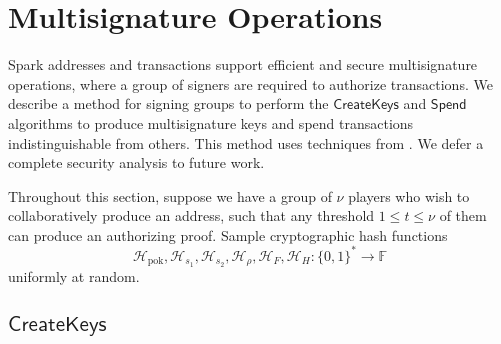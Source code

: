\documentclass{llncs}
\newcommand{\F}{\mathbb{F}}
\newcommand{\hash}{\mathcal{H}}
\newcommand{\func}[1]{\mathsf{#1}}
\begin{document}
\section{Multisignature Operations}

Spark addresses and transactions support efficient and secure multisignature operations, where a group of signers are required to authorize transactions.
We describe a method for signing groups to perform the $\func{CreateKeys}$ and $\func{Spend}$ algorithms to produce multisignature keys and spend transactions indistinguishable from others.
This method uses techniques from \cite{musig,schnorr,schnorrwithschnorr}.
We defer a complete security analysis to future work.

Throughout this section, suppose we have a group of $\nu$ players who wish to collaboratively produce an address, such that any threshold $1 \leq t \leq \nu$ of them can produce an authorizing proof.
Sample cryptographic hash functions $$\hash_{\text{pok}},\hash_{s_1},\hash_{s_2},\hash_{\rho},\hash_{F},\hash_{H}: \{0,1\}^* \to \F$$ uniformly at random.


\subsection{\texorpdfstring{$\func{CreateKeys}$}{CreateKeys}}
\end{document}
